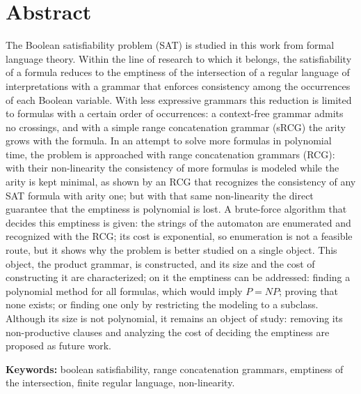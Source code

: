 \documentclass{report}
\begin{document}
\chapter*{Abstract}

The Boolean satisfiability problem (SAT) is studied in this work from
formal language theory. Within the line of research to which it belongs,
the satisfiability of a formula reduces to the emptiness of the
intersection of a regular language of interpretations with a grammar that
enforces consistency among the occurrences of each Boolean variable. With
less expressive grammars this reduction is limited to formulas with a
certain order of occurrences: a context-free grammar admits no crossings,
and with a simple range concatenation grammar (sRCG) the arity grows with
the formula. In an attempt to solve more formulas in polynomial time, the
problem is approached with range concatenation grammars (RCG): with their
non-linearity the consistency of more formulas is modeled while the arity
is kept minimal, as shown by an RCG that recognizes the consistency of
any SAT formula with arity one; but with that same non-linearity the
direct guarantee that the emptiness is polynomial is lost. A brute-force
algorithm that decides this emptiness is given: the strings of the
automaton are enumerated and recognized with the RCG; its cost is
exponential, so enumeration is not a feasible route, but it shows why the
problem is better studied on a single object. This object, the product
grammar, is constructed, and its size and the cost of constructing it are
characterized; on it the emptiness can be addressed: finding a polynomial
method for all formulas, which would imply $P = NP$; proving that none
exists; or finding one only by restricting the modeling to a subclass.
Although its size is not polynomial, it remains an object of study:
removing its non-productive clauses and analyzing the cost of deciding
the emptiness are proposed as future work.

\vspace{1em}
\noindent\textbf{Keywords:} boolean satisfiability, range concatenation
grammars, emptiness of the intersection, finite regular language,
non-linearity.
\end{document}
